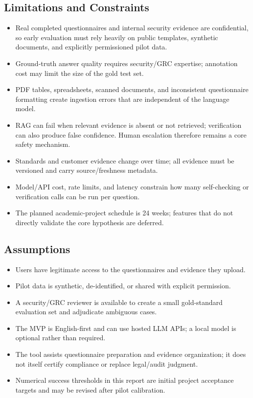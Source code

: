 \documentclass[11pt,journal,onecolumn]{IEEEtran}
\begin{document}
\subsection{Limitations and Constraints}
\begin{itemize}[leftmargin=1.7em]
    \item Real completed questionnaires and internal security evidence are confidential, so early evaluation must rely heavily on public templates, synthetic documents, and explicitly permissioned pilot data.
    \item Ground-truth answer quality requires security/GRC expertise; annotation cost may limit the size of the gold test set.
    \item PDF tables, spreadsheets, scanned documents, and inconsistent questionnaire formatting create ingestion errors that are independent of the language model.
    \item RAG can fail when relevant evidence is absent or not retrieved; verification can also produce false confidence. Human escalation therefore remains a core safety mechanism.
    \item Standards and customer evidence change over time; all evidence must be versioned and carry source/freshness metadata.
    \item Model/API cost, rate limits, and latency constrain how many self-checking or verification calls can be run per question.
    \item The planned academic-project schedule is 24 weeks; features that do not directly validate the core hypothesis are deferred.
\end{itemize}

\subsection{Assumptions}
\begin{itemize}[leftmargin=1.7em]
    \item Users have legitimate access to the questionnaires and evidence they upload.
    \item Pilot data is synthetic, de-identified, or shared with explicit permission.
    \item A security/GRC reviewer is available to create a small gold-standard evaluation set and adjudicate ambiguous cases.
    \item The MVP is English-first and can use hosted LLM APIs; a local model is optional rather than required.
    \item The tool assists questionnaire preparation and evidence organization; it does not itself certify compliance or replace legal/audit judgment.
    \item Numerical success thresholds in this report are initial project acceptance targets and may be revised after pilot calibration.
\end{itemize}
\end{document}
